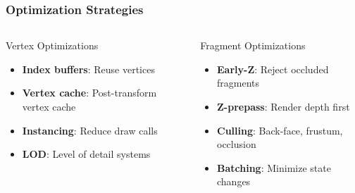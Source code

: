 \begin{frame}
  \frametitle{Optimization Strategies}

  \begin{columns}
    \begin{column}{0.5\textwidth}
      \begin{conceptbox}{Vertex Optimizations}
        \begin{itemize}
          \item \textbf{Index buffers}: Reuse vertices
          \item \textbf{Vertex cache}: Post-transform vertex cache
          \item \textbf{Instancing}: Reduce draw calls
          \item \textbf{LOD}: Level of detail systems
        \end{itemize}
      \end{conceptbox}
    \end{column}

    \begin{column}{0.5\textwidth}
      \begin{conceptbox}{Fragment Optimizations}
        \begin{itemize}
          \item \textbf{Early-Z}: Reject occluded fragments
          \item \textbf{Z-prepass}: Render depth first
          \item \textbf{Culling}: Back-face, frustum, occlusion
          \item \textbf{Batching}: Minimize state changes
        \end{itemize}
      \end{conceptbox}
    \end{column}
  \end{columns}

  \vspace{0.5cm}

  \begin{center}
  \end{center}

\end{frame}


